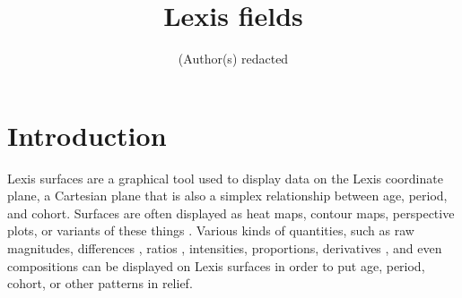 \documentclass{article}
\begin{document}
\title{Lexis fields}

\author{(Author(s) redacted}


\maketitle


\onehalfspacing
\section*{Introduction}
Lexis surfaces are a graphical tool used to display data on the Lexis coordinate plane, a Cartesian plane that is also a simplex relationship between age, period, and cohort. Surfaces are often displayed as heat maps, contour maps, perspective plots, or variants of these things \citep{vaupel1987thousands}. Various kinds of quantities, such as raw magnitudes, differences \citep{minton2017visualising}, ratios \citep{canudas2005age}, intensities, proportions, derivatives \citep{rau2017visualizing}, and even compositions \citep{scholey2017visualizing} can be displayed on Lexis surfaces in order to put age, period, cohort, or other patterns in relief. 
\end{document}
